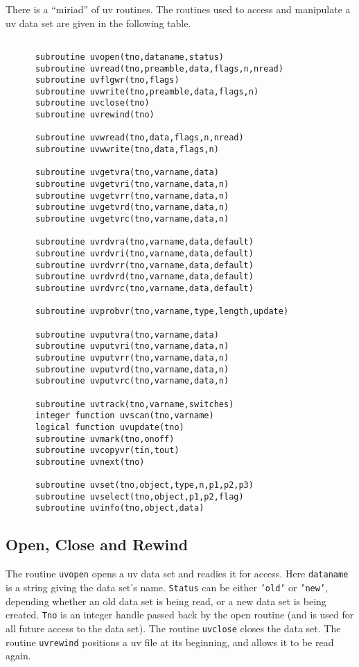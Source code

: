 There is a ``miriad'' of uv routines.
The routines used to access and manipulate a uv data set are given in the
following table.
\begin{table}
\begin{verbatim}

      subroutine uvopen(tno,dataname,status)
      subroutine uvread(tno,preamble,data,flags,n,nread)
      subroutine uvflgwr(tno,flags)
      subroutine uvwrite(tno,preamble,data,flags,n)
      subroutine uvclose(tno)
      subroutine uvrewind(tno)

      subroutine uvwread(tno,data,flags,n,nread)
      subroutine uvwwrite(tno,data,flags,n)

      subroutine uvgetvra(tno,varname,data)
      subroutine uvgetvri(tno,varname,data,n)
      subroutine uvgetvrr(tno,varname,data,n)
      subroutine uvgetvrd(tno,varname,data,n)
      subroutine uvgetvrc(tno,varname,data,n)

      subroutine uvrdvra(tno,varname,data,default)
      subroutine uvrdvri(tno,varname,data,default)
      subroutine uvrdvrr(tno,varname,data,default)
      subroutine uvrdvrd(tno,varname,data,default)
      subroutine uvrdvrc(tno,varname,data,default)

      subroutine uvprobvr(tno,varname,type,length,update)

      subroutine uvputvra(tno,varname,data)
      subroutine uvputvri(tno,varname,data,n)
      subroutine uvputvrr(tno,varname,data,n)
      subroutine uvputvrd(tno,varname,data,n)
      subroutine uvputvrc(tno,varname,data,n)

      subroutine uvtrack(tno,varname,switches)
      integer function uvscan(tno,varname)
      logical function uvupdate(tno)
      subroutine uvmark(tno,onoff)
      subroutine uvcopyvr(tin,tout)
      subroutine uvnext(tno)

      subroutine uvset(tno,object,type,n,p1,p2,p3)
      subroutine uvselect(tno,object,p1,p2,flag)
      subroutine uvinfo(tno,object,data)
\end{verbatim}
\caption{UV Data Subroutines}
\end{table}

\subsection{Open, Close and Rewind}
The routine {\tt uvopen} opens a uv data set and readies it for access.
Here {\tt dataname} is a string giving the data set's name. {\tt Status} can
be either {\tt 'old'} or {\tt 'new'}, depending whether an old data set is
being read, or a new data set is being created. {\tt Tno} is an integer
handle passed back by the open routine (and is used for all future access
to the data set). The routine {\tt uvclose} closes the data set.
The routine {\tt uvrewind} positions a uv file at its beginning, and
allows it to be read again.

